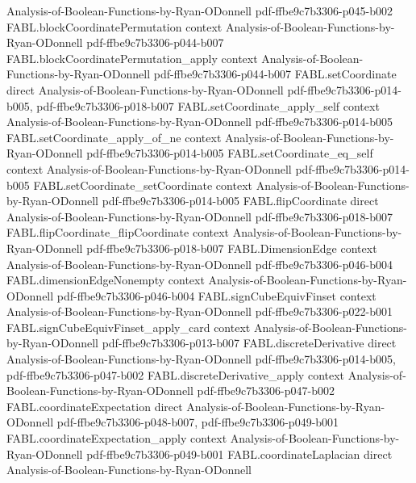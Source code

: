 \begin{theorem}
  {Analysis-of-Boolean-Functions-by-Ryan-ODonnell}
  {pdf-ffbe9c7b3306-p045-b002}
\proofstep
  {FABL.blockCoordinatePermutation}
  {context}
  {Analysis-of-Boolean-Functions-by-Ryan-ODonnell}
  {pdf-ffbe9c7b3306-p044-b007}
\proofstep
  {FABL.blockCoordinatePermutation_apply}
  {context}
  {Analysis-of-Boolean-Functions-by-Ryan-ODonnell}
  {pdf-ffbe9c7b3306-p044-b007}
\proofstep
  {FABL.setCoordinate}
  {direct}
  {Analysis-of-Boolean-Functions-by-Ryan-ODonnell}
  {pdf-ffbe9c7b3306-p014-b005,
    pdf-ffbe9c7b3306-p018-b007}
\proofstep
  {FABL.setCoordinate_apply_self}
  {context}
  {Analysis-of-Boolean-Functions-by-Ryan-ODonnell}
  {pdf-ffbe9c7b3306-p014-b005}
\proofstep
  {FABL.setCoordinate_apply_of_ne}
  {context}
  {Analysis-of-Boolean-Functions-by-Ryan-ODonnell}
  {pdf-ffbe9c7b3306-p014-b005}
\proofstep
  {FABL.setCoordinate_eq_self}
  {context}
  {Analysis-of-Boolean-Functions-by-Ryan-ODonnell}
  {pdf-ffbe9c7b3306-p014-b005}
\proofstep
  {FABL.setCoordinate_setCoordinate}
  {context}
  {Analysis-of-Boolean-Functions-by-Ryan-ODonnell}
  {pdf-ffbe9c7b3306-p014-b005}
\proofstep
  {FABL.flipCoordinate}
  {direct}
  {Analysis-of-Boolean-Functions-by-Ryan-ODonnell}
  {pdf-ffbe9c7b3306-p018-b007}
\proofstep
  {FABL.flipCoordinate_flipCoordinate}
  {context}
  {Analysis-of-Boolean-Functions-by-Ryan-ODonnell}
  {pdf-ffbe9c7b3306-p018-b007}
\proofstep
  {FABL.DimensionEdge}
  {context}
  {Analysis-of-Boolean-Functions-by-Ryan-ODonnell}
  {pdf-ffbe9c7b3306-p046-b004}
\proofstep
  {FABL.dimensionEdgeNonempty}
  {context}
  {Analysis-of-Boolean-Functions-by-Ryan-ODonnell}
  {pdf-ffbe9c7b3306-p046-b004}
\proofstep
  {FABL.signCubeEquivFinset}
  {context}
  {Analysis-of-Boolean-Functions-by-Ryan-ODonnell}
  {pdf-ffbe9c7b3306-p022-b001}
\proofstep
  {FABL.signCubeEquivFinset_apply_card}
  {context}
  {Analysis-of-Boolean-Functions-by-Ryan-ODonnell}
  {pdf-ffbe9c7b3306-p013-b007}
\proofstep
  {FABL.discreteDerivative}
  {direct}
  {Analysis-of-Boolean-Functions-by-Ryan-ODonnell}
  {pdf-ffbe9c7b3306-p014-b005,
    pdf-ffbe9c7b3306-p047-b002}
\proofstep
  {FABL.discreteDerivative_apply}
  {context}
  {Analysis-of-Boolean-Functions-by-Ryan-ODonnell}
  {pdf-ffbe9c7b3306-p047-b002}
\proofstep
  {FABL.coordinateExpectation}
  {direct}
  {Analysis-of-Boolean-Functions-by-Ryan-ODonnell}
  {pdf-ffbe9c7b3306-p048-b007,
    pdf-ffbe9c7b3306-p049-b001}
\proofstep
  {FABL.coordinateExpectation_apply}
  {context}
  {Analysis-of-Boolean-Functions-by-Ryan-ODonnell}
  {pdf-ffbe9c7b3306-p049-b001}
\proofstep
  {FABL.coordinateLaplacian}
  {direct}
  {Analysis-of-Boolean-Functions-by-Ryan-ODonnell}

\end{theorem}
